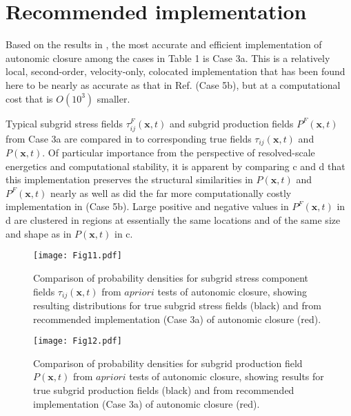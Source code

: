\section{Recommended implementation}
\label{sec:IVG}

Based on the results in , the most accurate and efficient implementation of autonomic closure among the cases in Table 1 is Case 3a. This is a relatively local, second-order, velocity-only, colocated implementation that has been found here to be nearly as accurate as that in Ref.  \cite{king2016autonomic} (Case 5b), but at a computational cost that is $O(10^3)$ smaller.  

Typical subgrid stress fields  $\tau_{ij}^{F}(\mathbf{x},t)$ and subgrid production fields $P^{F}(\mathbf{x},t)$  from Case 3a are compared in  to corresponding true fields $\tau_{ij}(\mathbf{x},t)$  and $P(\mathbf{x},t)$. Of particular importance from the perspective of resolved-scale energetics and computational stability, it is apparent by comparing c and d that this implementation preserves the structural similarities in  $P(\mathbf{x},t)$ and $P^{F}(\mathbf{x},t)$  nearly as well as did the far more computationally costly implementation in  (Case 5b). Large positive and negative values in $P^{F}(\mathbf{x},t)$ in d are clustered in regions at essentially the same locations and of the same size and shape as in $P(\mathbf{x},t)$  in c. 

%
\begin{figure}
	\begin{center}
	\texttt{[image: Fig11.pdf]}
	\caption{Comparison of probability densities for subgrid stress component fields $\tau_{ij}(\mathbf{x},t)$ from $a priori$ tests of autonomic closure, showing resulting distributions for true subgrid stress fields (black) and from recommended implementation (Case 3a) of autonomic closure (red).}
	\label{F:11}
	\end{center}
\end{figure}
%
%
%
\begin{figure}
	\begin{center}
	\texttt{[image: Fig12.pdf]}
	\caption{Comparison of probability densities for subgrid production field $P(\mathbf{x},t)$ from $a priori$ tests of autonomic closure, showing results for true subgrid production fields (black) and from recommended implementation (Case 3a) of autonomic closure (red).}
	\label{F:12}
	\end{center}
\end{figure}
%
%


